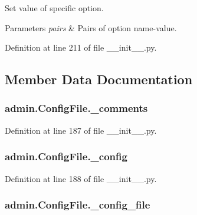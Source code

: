 Set value of specific option. 


\begin{DoxyParams}{Parameters}
{\em pairs} & Pairs of option name-\/value. \\
\hline
\end{DoxyParams}


Definition at line 211 of file \-\_\-\-\_\-init\-\_\-\-\_\-.\-py.



\subsection{Member Data Documentation}
\hypertarget{classadmin_1_1ConfigFile_ac15829b16933412a7db88d3dacdcf345}{
\subsubsection[{\-\_\-comments}]{\setlength{\rightskip}{0pt plus 5cm}admin.\-Config\-File.\-\_\-comments\hspace{0.3cm}{\ttfamily [private]}}}\label{classadmin_1_1ConfigFile_ac15829b16933412a7db88d3dacdcf345}


Definition at line 187 of file \-\_\-\-\_\-init\-\_\-\-\_\-.\-py.

\hypertarget{classadmin_1_1ConfigFile_a5a5c415d13ee87e1a03c9f64231a4fc9}{
\subsubsection[{\-\_\-config}]{\setlength{\rightskip}{0pt plus 5cm}admin.\-Config\-File.\-\_\-config\hspace{0.3cm}{\ttfamily [private]}}}\label{classadmin_1_1ConfigFile_a5a5c415d13ee87e1a03c9f64231a4fc9}


Definition at line 188 of file \-\_\-\-\_\-init\-\_\-\-\_\-.\-py.

\hypertarget{classadmin_1_1ConfigFile_ada03146a25635d360b9994efcd3eb6ce}{
\subsubsection[{\-\_\-config\-\_\-file}]{\setlength{\rightskip}{0pt plus 5cm}admin.\-Config\-File.\-\_\-config\-\_\-file\hspace{0.3cm}{\ttfamily [private]}}}\label{classadmin_1_1ConfigFile_ada03146a25635d360b9994efcd3eb6ce}


